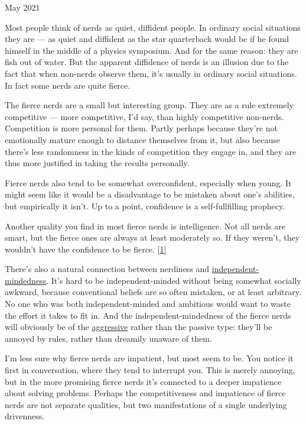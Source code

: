 May 2021

Most people think of nerds as quiet, diffident people. In ordinary
social situations they are --- as quiet and diffident as the star
quarterback would be if he found himself in the middle of a physics
symposium. And for the same reason: they are fish out of water. But the
apparent diffidence of nerds is an illusion due to the fact that when
non-nerds observe them, it's usually in ordinary social situations. In
fact some nerds are quite fierce.

The fierce nerds are a small but interesting group. They are as a rule
extremely competitive --- more competitive, I'd say, than highly
competitive non-nerds. Competition is more personal for them. Partly
perhaps because they're not emotionally mature enough to distance
themselves from it, but also because there's less randomness in the
kinds of competition they engage in, and they are thus more justified in
taking the results personally.

Fierce nerds also tend to be somewhat overconfident, especially when
young. It might seem like it would be a disadvantage to be mistaken
about one's abilities, but empirically it isn't. Up to a point,
confidence is a self-fullfilling prophecy.

Another quality you find in most fierce nerds is intelligence. Not all
nerds are smart, but the fierce ones are always at least moderately so.
If they weren't, they wouldn't have the confidence to be fierce.
{[}\hyperref[f1n]{1}{]}

There's also a natural connection between nerdiness and
\href{think.html}{independent-mindedness}. It's hard to be
independent-minded without being somewhat socially awkward, because
conventional beliefs are so often mistaken, or at least arbitrary. No
one who was both independent-minded and ambitious would want to waste
the effort it takes to fit in. And the independent-mindedness of the
fierce nerds will obviously be of the \href{conformism.html}{aggressive}
rather than the passive type: they'll be annoyed by rules, rather than
dreamily unaware of them.

I'm less sure why fierce nerds are impatient, but most seem to be. You
notice it first in conversation, where they tend to interrupt you. This
is merely annoying, but in the more promising fierce nerds it's
connected to a deeper impatience about solving problems. Perhaps the
competitiveness and impatience of fierce nerds are not separate
qualities, but two manifestations of a single underlying drivenness.


